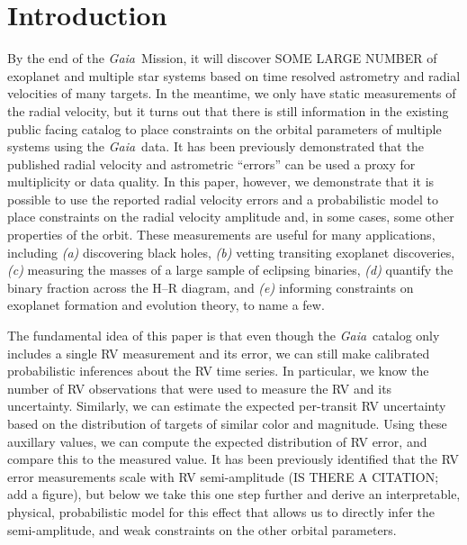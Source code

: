 \documentclass[modern, letterpaper]{aastex631}
\newcommand{\project}[1]{\textsl{#1}}
\newcommand{\Gaia}{\project{Gaia}}
\begin{document}

\section{Introduction} \label{sec:intro}

By the end of the \Gaia\ Mission, it will discover SOME LARGE NUMBER of exoplanet and multiple star systems based on time resolved astrometry and radial velocities of many targets.
In the meantime, we only have static measurements of the radial velocity, but it turns out that there is still information in the existing public facing catalog to place constraints on the orbital parameters of multiple systems using the \Gaia\ data.
It has been previously demonstrated that the published radial velocity and astrometric ``errors'' can be used a proxy for multiplicity or data quality.
In this paper, however, we demonstrate that it is possible to use the reported radial velocity errors and a probabilistic model to place constraints on the radial velocity amplitude and, in some cases, some other properties of the orbit.
These measurements are useful for many applications, including \emph{(a)} discovering black holes, \emph{(b)} vetting transiting exoplanet discoveries, \emph{(c)} measuring the masses of a large sample of eclipsing binaries, \emph{(d)} quantify the binary fraction across the H--R diagram, and \emph{(e)} informing constraints on exoplanet formation and evolution theory, to name a few.

The fundamental idea of this paper is that even though the \Gaia\ catalog only includes a single RV measurement and its error, we can still make calibrated probabilistic inferences about the RV time series.
In particular, we know the number of RV observations that were used to measure the RV and its uncertainty.
Similarly, we can estimate the expected per-transit RV uncertainty based on the distribution of targets of similar color and magnitude.
Using these auxillary values, we can compute the expected distribution of RV error, and compare this to the measured value.
It has been previously identified that the RV error measurements scale with RV semi-amplitude \citep[e.g.,][with APOGEE data]{Badenes2018} (IS THERE A CITATION; add a figure), but below we take this one step further and derive an interpretable, physical, probabilistic model for this effect that allows us to directly infer the semi-amplitude, and weak constraints on the other orbital parameters.
\end{document}
